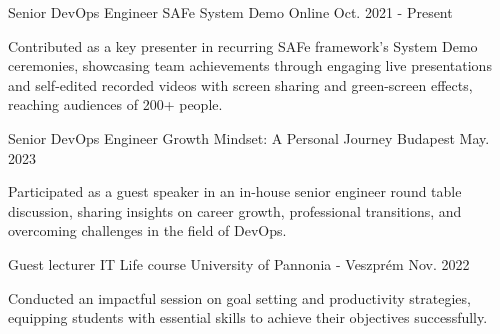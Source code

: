 

\begin{cventries}

  \cventry
    {Senior DevOps Engineer} %
    {SAFe System Demo} %
    {Online} %
    {Oct. 2021 - Present} %
    {
      \begin{cvitems} %
        \item {Contributed as a key presenter in recurring SAFe framework's System Demo ceremonies, showcasing team achievements through engaging live presentations and self-edited recorded videos with screen sharing and green-screen effects, reaching audiences of 200+ people.}
      \end{cvitems}
    }

  \cventry
    {Senior DevOps Engineer} %
    {Growth Mindset: A Personal Journey} %
    {Budapest} %
    {May. 2023} %
    {
      \begin{cvitems} %
        \item {Participated as a guest speaker in an in-house senior engineer round table discussion, sharing insights on career growth, professional transitions, and overcoming challenges in the field of DevOps.}
      \end{cvitems}
    }

  \cventry
    {Guest lecturer} %
    {IT Life course} %
    {University of Pannonia - Veszprém} %
    {Nov. 2022} %
    {
      \begin{cvitems} %
        \item {Conducted an impactful session on goal setting and productivity strategies, equipping students with essential skills to achieve their objectives successfully.}
      \end{cvitems}
    }


\end{cventries}
